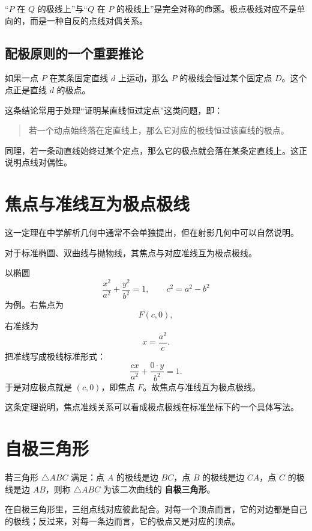 \begin{conclusion}
“$P$ 在 $Q$ 的极线上”与“$Q$ 在 $P$ 的极线上”是完全对称的命题。极点极线对应不是单向的，而是一种自反的点线对偶关系。
\end{conclusion}

\subsection{配极原则的一个重要推论}
如果一点 $P$ 在某条固定直线 $d$ 上运动，那么 $P$ 的极线会恒过某个固定点 $D$。这个点正是直线 $d$ 的极点。

这条结论常用于处理“证明某直线恒过定点”这类问题，即：

\begin{quote}
若一个动点始终落在定直线上，那么它对应的极线恒过该直线的极点。
\end{quote}

同理，若一条动直线始终过某个定点，那么它的极点就会落在某条定直线上。这正说明点线对偶性。

\section{焦点与准线互为极点极线}
这一定理在中学解析几何中通常不会单独提出，但在射影几何中可以自然说明。

\begin{theorem}
对于标准椭圆、双曲线与抛物线，其焦点与对应准线互为极点极线。
\end{theorem}

\begin{myproof}
以椭圆
\[
\frac{x^2}{a^2}+\frac{y^2}{b^2}=1,\qquad c^2=a^2-b^2
\]
为例。右焦点为
\[
F(c,0),
\]
右准线为
\[
x=\frac{a^2}{c}.
\]
把准线写成极线标准形式：
\[
\frac{cx}{a^2}+\frac{0\cdot y}{b^2}=1.
\]
于是对应极点就是 $(c,0)$，即焦点 $F$。故焦点与准线互为极点极线。
\end{myproof}

这条定理说明，焦点准线关系可以看成极点极线在标准坐标下的一个具体写法。

\section{自极三角形}
\begin{definition}
若三角形 $\triangle ABC$ 满足：点 $A$ 的极线是边 $BC$，点 $B$ 的极线是边 $CA$，点 $C$ 的极线是边 $AB$，则称 $\triangle ABC$ 为该二次曲线的 \textbf{自极三角形}。
\end{definition}

在自极三角形里，三组点线对应彼此配合。对每一个顶点而言，它的对边都是自己的极线；反过来，对每一条边而言，它的极点又是对应的顶点。

